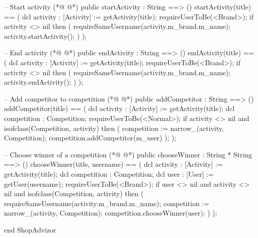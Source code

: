 \begin{vdmpp}[breaklines=true]
 -- Start activity
(*@
\label{startActivity:317}
@*)
 public startActivity : String ==> ()
 startActivity(title) == 
 ( 
  dcl activity : [Activity] := getActivity(title);
  requireUserToBe(<Brand>);
  if activity <> nil
   then (
    requireSameUsername(activity.m_brand.m_name);
    activity.startActivity();
   )
 );
 
 -- End activity
(*@
\label{endActivity:330}
@*)
 public endActivity : String ==> ()
 endActivity(title) == 
 ( 
  dcl activity : [Activity] := getActivity(title);
  requireUserToBe(<Brand>);
  if activity <> nil
   then (
    requireSameUsername(activity.m_brand.m_name);  
    activity.endActivity();
   )
 );
 
 -- Add competitor to competition
(*@
\label{addCompetitor:343}
@*)
 public addCompetitor : String ==> ()
 addCompetitor(title) == 
 ( 
  dcl activity : [Activity] := getActivity(title);
  dcl competition : Competition;
  requireUserToBe(<Normal>);
  if activity <> nil and isofclass(Competition, activity)
   then (
    competition := narrow_(activity, Competition);
    competition.addCompetitor(m_user)
   );
 );
 
 -- Choose winner of a competition
(*@
\label{chooseWinner:357}
@*)
 public chooseWinner : String * String ==> ()
 chooseWinner(title, username) == 
 ( 
  dcl activity : [Activity] := getActivity(title);
  dcl competition : Competition;
  dcl user : [User] := getUser(username);
  requireUserToBe(<Brand>);
  if user <> nil and activity <> nil and isofclass(Competition, activity)
   then (
    requireSameUsername(activity.m_brand.m_name);
    competition := narrow_(activity, Competition);
    competition.chooseWinner(user);
   )
 );

end ShopAdvizor
\end{vdmpp}
\bigskip
